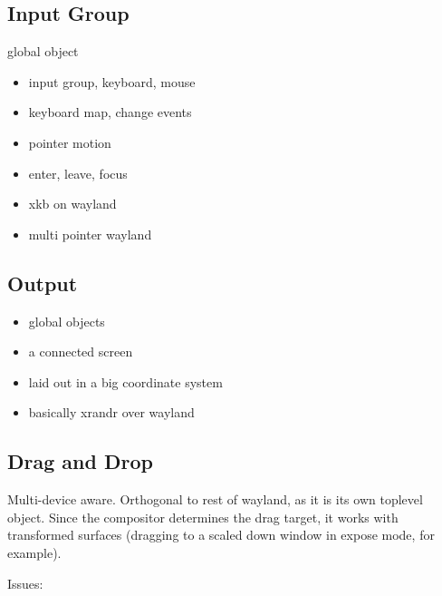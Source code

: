 \documentclass{article}
\begin{document}
\subsection{Input Group}

global object

\begin{itemize}
\item input group, keyboard, mouse
\item keyboard map, change events
\item pointer motion
\item enter, leave, focus
\item xkb on wayland
\item multi pointer wayland
\end{itemize}


\subsection{Output}

\begin{itemize}
\item global objects
\item a connected screen
\item laid out in a big coordinate system
\item basically xrandr over wayland
\end{itemize}

\subsection{Drag and Drop}

Multi-device aware. Orthogonal to rest of wayland, as it is its own
toplevel object.  Since the compositor determines the drag target, it
works with transformed surfaces (dragging to a scaled down window in
expose mode, for example).

Issues: 
\end{document}
